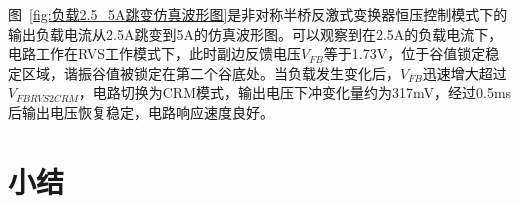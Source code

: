 图~\ref{fig:负载2.5_5A跳变仿真波形图}是非对称半桥反激式变换器恒压控制模式下的输出负载电流从2.5A跳变到5A的仿真波形图。可以观察到在2.5A的负载电流下，电路工作在RVS工作模式下，此时副边反馈电压$V_{FB}$等于1.73V，位于谷值锁定稳定区域，谐振谷值被锁定在第二个谷底处。当负载发生变化后，$V_{FB}$迅速增大超过$V_{FBRVS2CRM}$，电路切换为CRM模式，输出电压下冲变化量约为317mV，经过0.5ms后输出电压恢复稳定，电路响应速度良好。






%
%



\section{小结}





